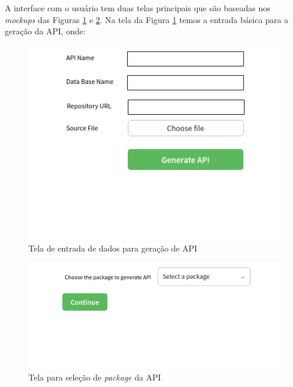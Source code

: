 A interface com o usuário tem duas telas principais que são baseadas nos \textit{mockups} das Figuras \ref{fig:mindex} e \ref{fig:mpacks}. Na tela da Figura \ref{fig:mindex} temos a entrada básica para a geração da API, onde:

\begin{figure}
    \begin{center}
        \includegraphics[scale=0.7]{imagens/Mockup_index.png}
    \end{center}
	\caption{\label{fig:mindex}Tela de entrada de dados para geração de API}
\end{figure}

\begin{figure}
    \begin{center}
        \includegraphics[scale=0.7]{imagens/Mockup_pack_select.png}
    \end{center}
	\caption{\label{fig:mpacks}Tela para seleção de \textit{package} da API}
\end{figure}

